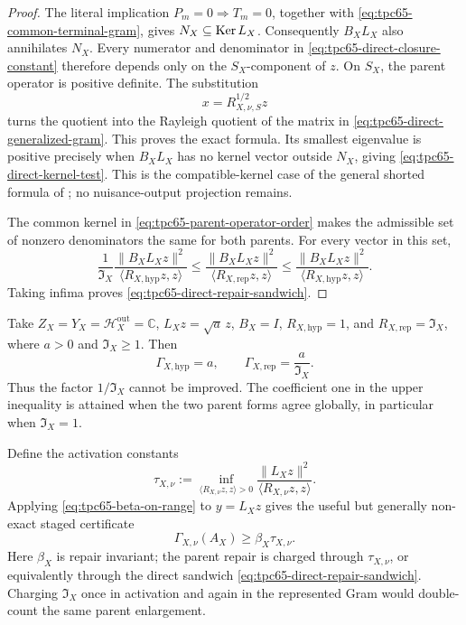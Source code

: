 \begin{proof}
The literal implication \(P_m=0\Rightarrow T_m=0\), together with
\eqref{eq:tpc65-common-terminal-gram}, gives
\(N_X\subseteq\operatorname{Ker} L_X\).  Consequently \(B_XL_X\) also annihilates
\(N_X\).  Every numerator and denominator in
\eqref{eq:tpc65-direct-closure-constant} therefore depends only on the
\(S_X\)-component of \(z\).  On \(S_X\), the parent operator is positive
definite.  The substitution
\[
 x=R_{X,\nu,S}^{1/2}z
\]
turns the quotient into the Rayleigh quotient of the matrix in
\eqref{eq:tpc65-direct-generalized-gram}.  This proves the exact formula.
Its smallest eigenvalue is positive precisely when \(B_XL_X\) has no
kernel vector outside \(N_X\), giving
\eqref{eq:tpc65-direct-kernel-test}.  This is the compatible-kernel case
of the general shorted formula of \citet{WangTPC62}; no nuisance-output
projection remains.

The common kernel in \eqref{eq:tpc65-parent-operator-order} makes the
admissible set of nonzero denominators the same for both parents.  For
every vector in this set,
\[
 \frac{1}{\mathfrak I_X}
 \frac{\|B_XL_Xz\|^2}
      {\langle R_{X,\mathrm{hyp}}z,z\rangle}
 \le
 \frac{\|B_XL_Xz\|^2}
      {\langle R_{X,\mathrm{rep}}z,z\rangle}
 \le
 \frac{\|B_XL_Xz\|^2}
      {\langle R_{X,\mathrm{hyp}}z,z\rangle}.
\]
Taking infima proves \eqref{eq:tpc65-direct-repair-sandwich}.
\end{proof}

\begin{example}
\label{ex:tpc65-repair-sandwich-sharp}
Take \(Z_X=Y_X=\mathcal H_X^{\mathrm{out}}=\mathbb C\),
\(L_Xz=\sqrt a\,z\), \(B_X=I\),
\(R_{X,\mathrm{hyp}}=1\), and
\(R_{X,\mathrm{rep}}=\mathfrak I_X\), where
\(a>0\) and \(\mathfrak I_X\ge1\).  Then
\[
 \Gamma_{X,\mathrm{hyp}}=a,
 \qquad
 \Gamma_{X,\mathrm{rep}}=\frac{a}{\mathfrak I_X}.
\]
Thus the factor \(1/\mathfrak I_X\) cannot be improved.  The coefficient
one in the upper inequality is attained when the two parent forms agree
globally, in particular when \(\mathfrak I_X=1\).
\end{example}

Define the activation constants
\begin{equation}
 \tau_{X,\nu}
 :=
 \inf_{\langle R_{X,\nu}z,z\rangle>0}
 \frac{\|L_Xz\|^2}{\langle R_{X,\nu}z,z\rangle}.
 \label{eq:tpc65-two-activation-constants}
\end{equation}
Applying \eqref{eq:tpc65-beta-on-range} to \(y=L_Xz\) gives the useful
but generally non-exact staged certificate
\begin{equation}
 \Gamma_{X,\nu}(A_X)
 \ge \beta_X\tau_{X,\nu}.
 \label{eq:tpc65-staged-beta-activation}
\end{equation}
Here \(\beta_X\) is repair invariant; the parent repair is charged through
\(\tau_{X,\nu}\), or equivalently through the direct sandwich
\eqref{eq:tpc65-direct-repair-sandwich}.  Charging
\(\mathfrak I_X\) once in activation and again in the represented Gram
would double-count the same parent enlargement.

